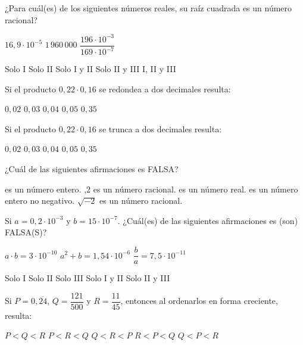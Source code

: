 \documentclass[pagina vacia]{srs}
\begin{document}
\begin{preguntas}[after-item-skip=1cm]
\pregunta ¿Para cuál(es) de los siguientes números reales, su raíz cuadrada es un número racional?
\begin{verticali}
\alternativa \(16,9 \cdot 10^{-5}\)
\alternativa \(1\,960\,000\)
\alternativa \(\dfrac{196 \cdot 10^{-3}}{169 \cdot 10^{-7}}\)
\end{verticali}
\begin{vertical}
\alternativa Solo I
\alternativa Solo II
\alternativa Solo I y II
\alternativa Solo II y III
\alternativa I, II y III
\end{vertical}

\pregunta Si el producto \(0,22 \cdot 0,16\) se redondea a dos decimales resulta:
\begin{vertical}
\alternativa $0,02$
\alternativa $0,03$
\alternativa $0,04$
\alternativa $0,05$
\alternativa $0,35$
\end{vertical}

\pregunta Si el producto \(0,22 \cdot 0,16\) se trunca a dos decimales resulta:
\begin{vertical}
\alternativa $0,02$
\alternativa $0,03$
\alternativa $0,04$
\alternativa $0,05$
\alternativa $0,35$
\end{vertical}

\pregunta ¿Cuál de las siguientes afirmaciones es FALSA?
\begin{vertical}
 es un número entero.
,2 es un número racional.
 es un número real.
 es un número entero no negativo.
\alternativa \( \sqrt{-2} \) es un número racional.
\end{vertical}

\pregunta Si \(a = 0,2 \cdot 10^{-3}\) y \(b = 15 \cdot 10^{-7}\). ¿Cuál(es) de las siguientes afirmaciones es (son) FALSA(S)?
\begin{verticali}
\alternativa \( a \cdot b = 3 \cdot 10^{-10} \)
\alternativa \( a^2 + b = 1,54 \cdot 10^{-6} \)
\alternativa \( \dfrac{b}{a} = 7,5 \cdot 10^{-11} \)
\end{verticali}
\begin{vertical}
\alternativa Solo I
\alternativa Solo II
\alternativa Solo III
\alternativa Solo I y II
\alternativa Solo II y III
\end{vertical}

\pregunta Si $P = 0,\overline{24}$, \(Q = \dfrac{121}{500} \) y \( R = \dfrac{11}{45} \), entonces al ordenarlos en forma creciente, resulta:
\begin{vertical}
\alternativa $P < Q < R$
\alternativa $P < R < Q$
\alternativa $Q < R < P$
\alternativa $R < P < Q$
\alternativa $Q < P < R$
\end{vertical}


\end{preguntas}
\end{document}
